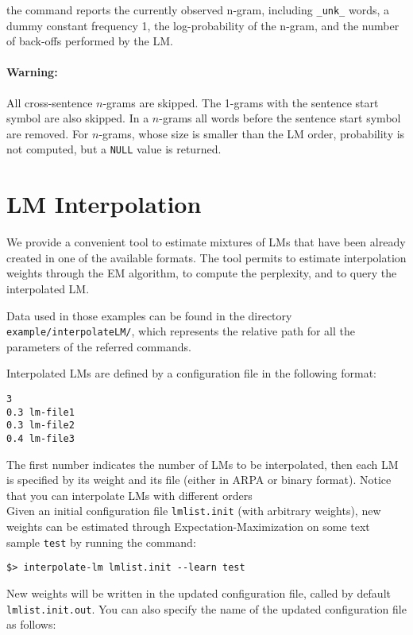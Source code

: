 \documentclass[11pt]{article}
\begin{document}
\noindent
the command reports the currently observed n-gram, 
including {\tt\_unk\_} words, a dummy
constant frequency 1, the log-probability of the n-gram, and the 
number of back-offs performed by the LM.  

\paragraph{Warning:} All cross-sentence $n$-grams are skipped. The 1-grams with the sentence start symbol are also skipped. In a $n$-grams all words before the sentence start symbol are removed. For $n$-grams, whose size is smaller than the LM order, probability is not computed, but a {\tt NULL} value is returned.


\newpage
\section{LM Interpolation}
We provide a convenient tool to estimate mixtures of LMs that have been already 
created in one of the available formats.  The tool permits to estimate interpolation
weights through the EM algorithm, to compute the perplexity, and to query the interpolated
LM. 

\noindent
Data used in those examples can be found in the directory {\tt example/interpolateLM/},
which represents the relative path for all the parameters of the referred commands.

\noindent
Interpolated LMs are defined by a configuration file in the following format:
\begin{verbatim}
3
0.3 lm-file1
0.3 lm-file2
0.4 lm-file3
\end{verbatim}

\noindent
The first number indicates the number of LMs to be interpolated, then each LM is specified
by its weight and its file (either in ARPA or binary format). Notice that you can interpolate
LMs with different orders\\

\noindent
Given an initial configuration file {\tt lmlist.init} (with arbitrary weights), new weights can be estimated
through Expectation-Maximization on some text sample {\tt test} by running the command:
\begin{verbatim}
$> interpolate-lm lmlist.init --learn test
\end{verbatim}
\noindent
New weights will be written in the updated configuration file, called by default {\tt lmlist.init.out}.
You can also specify the name of the updated configuration file as follows:
\end{document}
